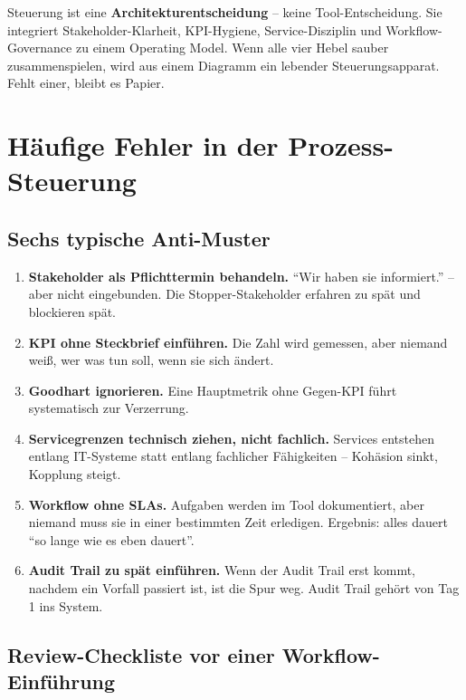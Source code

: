 \documentclass[11pt,a4paper,oneside]{article}
\newcommand{\fachbegriff}[1]{\textbf{#1}}
\begin{document}
\begin{merkbox}
Steuerung ist eine \textbf{Architektur­entscheidung} -- keine Tool-Entscheidung. Sie integriert Stakeholder-Klarheit, KPI-Hygiene, Service-Disziplin und Workflow-Governance zu einem Operating Model. Wenn alle vier Hebel sauber zusammenspielen, wird aus einem Diagramm ein lebender Steuerungs­apparat. Fehlt einer, bleibt es Papier.
\end{merkbox}

\section{Häufige Fehler in der Prozess-Steuerung}

\subsection{Sechs typische Anti-Muster}

\begin{enumerate}
  \item \fachbegriff{Stakeholder als Pflichttermin behandeln.} ``Wir haben sie informiert.'' -- aber nicht eingebunden. Die Stopper-Stakeholder erfahren zu spät und blockieren spät.
  \item \fachbegriff{KPI ohne Steckbrief einführen.} Die Zahl wird gemessen, aber niemand weiß, wer was tun soll, wenn sie sich ändert.
  \item \fachbegriff{Goodhart ignorieren.} Eine Hauptmetrik ohne Gegen-KPI führt systematisch zur Verzerrung.
  \item \fachbegriff{Servicegrenzen technisch ziehen, nicht fachlich.} Services entstehen entlang IT-Systeme statt entlang fachlicher Fähigkeiten -- Kohäsion sinkt, Kopplung steigt.
  \item \fachbegriff{Workflow ohne SLAs.} Aufgaben werden im Tool dokumentiert, aber niemand muss sie in einer bestimmten Zeit erledigen. Ergebnis: alles dauert ``so lange wie es eben dauert''.
  \item \fachbegriff{Audit Trail zu spät einführen.} Wenn der Audit Trail erst kommt, nachdem ein Vorfall passiert ist, ist die Spur weg. Audit Trail gehört von Tag 1 ins System.
\end{enumerate}

\subsection{Review-Checkliste vor einer Workflow-Einführung}
\end{document}
